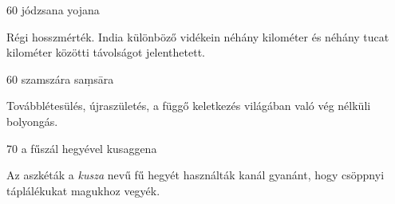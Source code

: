 
\begin{notesdescription}

\item[{60}
{jódzsana}
{yojana}] \hfill\par

Régi hosszmérték. India különböző vidékein néhány kilométer és néhány tucat kilométer közötti távolságot jelenthetett.

\item[{60}
{szamszára}
{saṃsāra}] \hfill\par

Továbblétesülés, újraszületés, a függő keletkezés világában való vég nélküli bolyongás.

\item[{70}
{a fűszál hegyével}
{kusaggena}] \hfill\par

Az aszkéták a \textit{kusza} nevű fű hegyét használták kanál gyanánt, hogy csöppnyi táplálékukat magukhoz vegyék.

\end{notesdescription}

